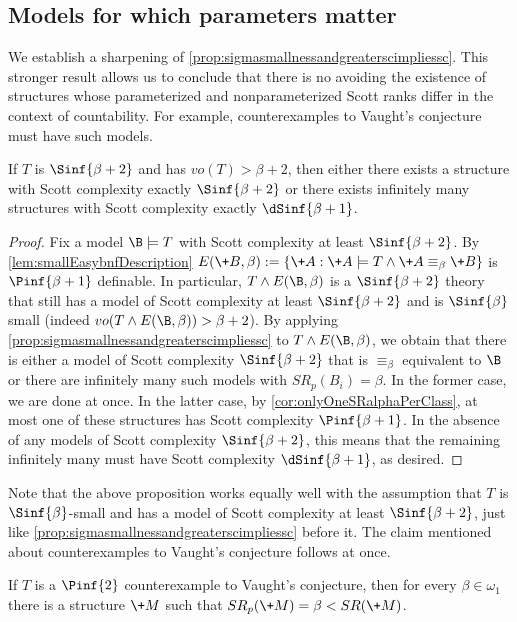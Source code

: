 \documentclass[10pt,a4paper]{amsart}
\renewcommand{\-}{\text{-}}
\begin{document}
\subsection{Models for which parameters matter}
We establish a sharpening of \cref{prop:sigmasmallnessandgreaterscimpliessc}.
This stronger result allows us to conclude that there is no avoiding the existence of structures whose parameterized and nonparameterized Scott ranks differ in the context of countability.
For example, counterexamples to Vaught's conjecture must have such models.

\begin{proposition}\label{prop:parametersMatter}
If $T$ is $\Sinf{\beta+2}$ and has $vo(T)>\beta+2$, then either there exists a structure with Scott complexity exactly $\Sinf{\beta+2}$ or there exists infinitely many structures with Scott complexity exactly $\dSinf{\beta+1}$.
\end{proposition}

\begin{proof}
Fix a model $\B\models T$ with Scott complexity at least $\Sinf{\beta+2}$.
By \cref{lem:smallEasybnfDescription} $E(\+B,\beta):=\{\+A : \+A\models T \land \+A\equiv_\beta \+B\}$ is $\Pinf{\beta+1}$ definable.
In particular, $T\land E(\B,\beta)$ is a $\Sinf{\beta+2}$ theory that still has a model of Scott complexity at least $\Sinf{\beta+2}$ and is $\Sinf{\beta}$ small (indeed $vo(T\land E(\B,\beta))>\beta+2$).
By applying \cref{prop:sigmasmallnessandgreaterscimpliessc} to $T\land E(\B,\beta)$, we obtain that there is either a model of Scott complexity $\Sinf{\beta+2}$ that is $\equiv_\beta$ equivalent to $\B$ or there are infinitely many such models with $SR_p(B_i)=\beta$.
In the former case, we are done at once.
In the latter case, by \cref{cor:onlyOneSRalphaPerClass}, at most one of these structures has Scott complexity $\Pinf{\beta+1}$.
In the absence of any models of Scott complexity $\Sinf{\beta+2}$, this means that the remaining infinitely many must have Scott complexity $\dSinf{\beta+1}$, as desired.
\end{proof}

Note that the above proposition works equally well with the assumption that $T$ is $\Sinf{\beta}$-small and has a model of Scott complexity at least $\Sinf{\beta+2}$, just like \cref{prop:sigmasmallnessandgreaterscimpliessc} before it.
The claim mentioned about counterexamples to Vaught's conjecture follows at once.

\begin{corollary}
  If $T$ is a $\Pinf{2}$ counterexample to Vaught's conjecture, then for every $\beta\in\omega_1$ there is a structure $\+M$ such that $SR_p(\+M)=\beta<SR(\+M)$.
\end{corollary}
\end{document}
